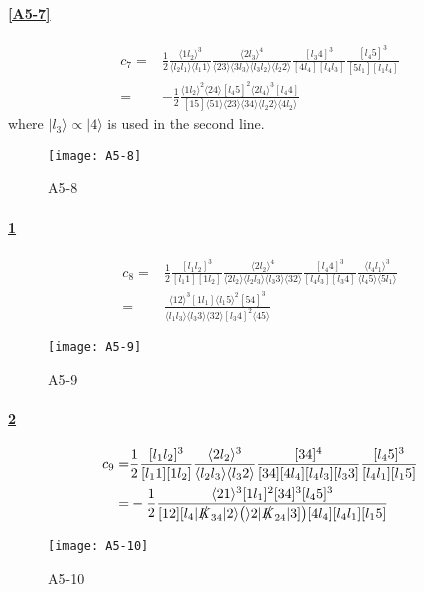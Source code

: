 \paragraph{\ref{A5-7}}
\begin{equation*}
\begin{split}
c_7 = & \frac{1}{2}\frac{\langle 1 l_2 \rangle^3}{\langle l_2 l_1 \rangle\langle l_1 1\rangle}
\frac{\langle 2 l_3 \rangle^4}{\langle 23\rangle\langle 3 l_3 \rangle\langle l_3 l_2\rangle\langle l_2 2 \rangle}
\frac{[l_3 4]^3}{[4 l_4][l_4 l_3]}
\frac{[l_4 5 ]^3}{[5 l_1 ][l_1 l_4]}
\\
= &
-\frac{1}{2}
\frac{\langle 1 l_2 \rangle^2\langle 24 \rangle [l_4 5]^2\langle 2 l_4\rangle^3 [l_4 4]}{[15]\langle 51 \rangle \langle 23 \rangle \langle 34 \rangle\langle l_2 2 \rangle\langle 4 l_2\rangle}
\end{split}
\end{equation*}
where $| l_3\rangle \propto |4\rangle$ is used in the second line.
%
%
\begin{figure}
  \centering
    \texttt{[image: A5-8]}
    \caption{A5-8}
  \label{A5-8}
\end{figure}
\paragraph{\ref{A5-8}}
\begin{equation*}
\begin{split}
c_8 = & \frac{1}{2}
\frac{[l_1 l_2]^3}{[l_1 1][1l_2]}
\frac{\langle 2 l_2 \rangle^4}{\langle 2l_2 \rangle\langle l_2 l_3\rangle\langle l_3 3 \rangle\langle 32 \rangle}
\frac{[l_4 4 ]^3}{[l_4 l_3][l_3 4]}
\frac{\langle l_4 l_1 \rangle^3}{\langle l_4 5 \rangle\langle 5 l_1\rangle}
\\
= &
\frac{\langle 12 \rangle^3[1l_1 ]\langle l_1 5\rangle^2 [54]^3}{\langle l_1 l_3\rangle\langle l_3 3 \rangle\langle 32 \rangle [l_3 4 ]^2\langle 45\rangle}
\end{split}
\end{equation*}
%
%
\begin{figure}
  \centering
    \texttt{[image: A5-9]}
    \caption{A5-9}
  \label{A5-9}
\end{figure}
\paragraph{\ref{A5-9}}
\begin{equation*}
\begin{split}
c_9 = & \frac{1}{2}\frac{[l_1 l_2]^3}{[l_1 1][1 l_2]}
\frac{\langle 2l_2 \rangle^3}{\langle l_2 l_3 \rangle\langle l_3 2 \rangle}
\frac{[34]^4}{[34][4 l_4][l_4 l_3][l_3 3]}
\frac{[l_4 5]^3}{[l_4 l_1][l_1 5]}
\\
= &
-\frac{1}{2}
\frac{\langle 21 \rangle^3 [1l_1]^2[34]^3[l_4 5]^3}{[12][l_4|\slashed{K}_{34}|2\rangle \big(\rangle 2 | \slashed{K}_{24}|3]\big) [4l_4][l_4 l_1 ][l_1 5]}
\end{split}
\end{equation*}
%
%
\begin{figure}
  \centering
    \texttt{[image: A5-10]}
    \caption{A5-10}
  \label{A5-10}
\end{figure}
